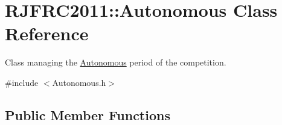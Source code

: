 \hypertarget{class_r_j_f_r_c2011_1_1_autonomous}{
\section{RJFRC2011::Autonomous Class Reference}
\label{class_r_j_f_r_c2011_1_1_autonomous}
}


Class managing the \hyperlink{class_r_j_f_r_c2011_1_1_autonomous}{Autonomous} period of the competition.  




{\ttfamily \#include $<$Autonomous.h$>$}

\subsection*{Public Member Functions}
